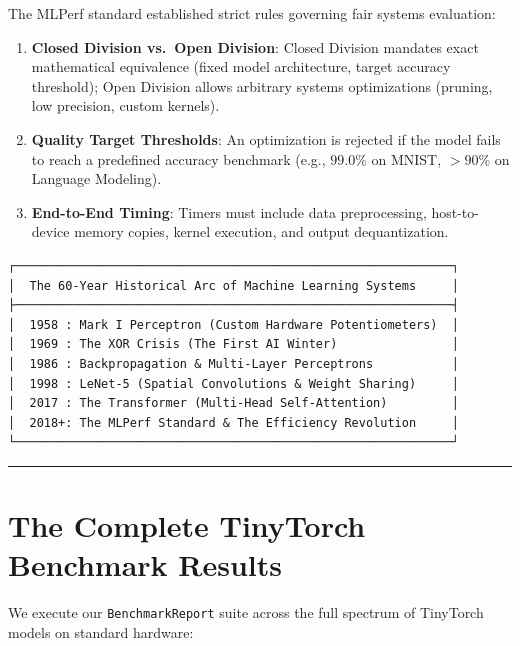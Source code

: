\documentclass[
  letterpaper,
]{scrbook}
\providecommand{\tightlist}{%
  \setlength{\itemsep}{0pt}\setlength{\parskip}{0pt}}
\begin{document}
The MLPerf standard established strict rules governing fair systems
evaluation:

\begin{enumerate}
\def\labelenumi{\arabic{enumi}.}
\tightlist
\item
  \textbf{Closed Division vs.~Open Division}: Closed Division mandates
  exact mathematical equivalence (fixed model architecture, target
  accuracy threshold); Open Division allows arbitrary systems
  optimizations (pruning, low precision, custom kernels).
\item
  \textbf{Quality Target Thresholds}: An optimization is rejected if the
  model fails to reach a predefined accuracy benchmark (e.g., \(99.0\%\)
  on MNIST, \(>90\%\) on Language Modeling).
\item
  \textbf{End-to-End Timing}: Timers must include data preprocessing,
  host-to-device memory copies, kernel execution, and output
  dequantization.
\end{enumerate}

\begin{verbatim}
┌─────────────────────────────────────────────────────────────┐
│  The 60-Year Historical Arc of Machine Learning Systems     │
├─────────────────────────────────────────────────────────────┤
│  1958 : Mark I Perceptron (Custom Hardware Potentiometers)  │
│  1969 : The XOR Crisis (The First AI Winter)                │
│  1986 : Backpropagation & Multi-Layer Perceptrons           │
│  1998 : LeNet-5 (Spatial Convolutions & Weight Sharing)     │
│  2017 : The Transformer (Multi-Head Self-Attention)         │
│  2018+: The MLPerf Standard & The Efficiency Revolution     │
└─────────────────────────────────────────────────────────────┘
\end{verbatim}

\begin{center}\rule{0.5\linewidth}{0.5pt}\end{center}

\section*{The Complete TinyTorch Benchmark
Results}\label{the-complete-tinytorch-benchmark-results}


We execute our \texttt{BenchmarkReport} suite across the full spectrum
of TinyTorch models on standard hardware:
\end{document}
